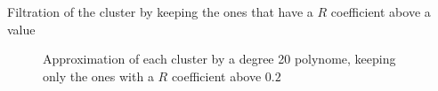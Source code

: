 \begin{frame}{Filtration of the cluster by keeping the ones that have a $R$ coefficient above a value}
    \begin{figure}
        \caption{Approximation of each cluster by a degree 20 polynome, keeping only the ones with a $R$ coefficient above $0.2$}
    \end{figure}
\end{frame}